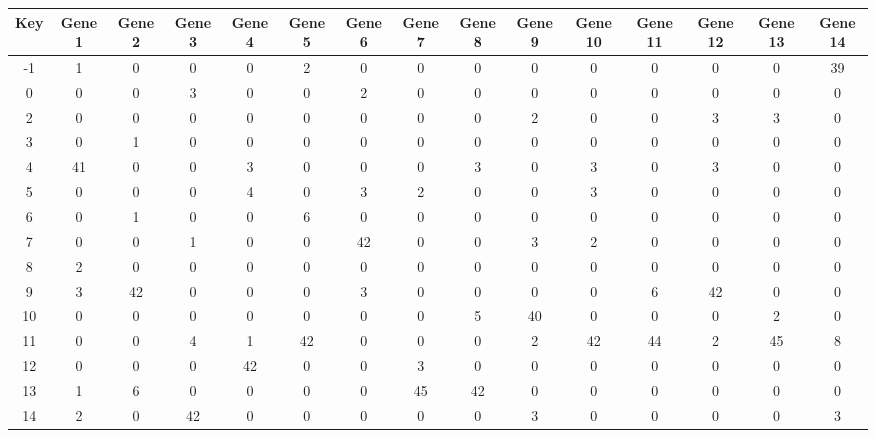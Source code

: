 \begin{tabular}{|c|c|c|c|c|c|c|c|c|c|c|c|c|c|c|}
\hline
Key & Gene 1 & Gene 2 & Gene 3 & Gene 4 & Gene 5 & Gene 6 & Gene 7 & Gene 8 & Gene 9 & Gene 10 & Gene 11 & Gene 12 & Gene 13 & Gene 14 \\
\hline
-1 & 1 & 0 & 0 & 0 & 2 & 0 & 0 & 0 & 0 & 0 & 0 & 0 & 0 & 39 \\
0 & 0 & 0 & 3 & 0 & 0 & 2 & 0 & 0 & 0 & 0 & 0 & 0 & 0 & 0 \\
2 & 0 & 0 & 0 & 0 & 0 & 0 & 0 & 0 & 2 & 0 & 0 & 3 & 3 & 0 \\
3 & 0 & 1 & 0 & 0 & 0 & 0 & 0 & 0 & 0 & 0 & 0 & 0 & 0 & 0 \\
4 & 41 & 0 & 0 & 3 & 0 & 0 & 0 & 3 & 0 & 3 & 0 & 3 & 0 & 0 \\
5 & 0 & 0 & 0 & 4 & 0 & 3 & 2 & 0 & 0 & 3 & 0 & 0 & 0 & 0 \\
6 & 0 & 1 & 0 & 0 & 6 & 0 & 0 & 0 & 0 & 0 & 0 & 0 & 0 & 0 \\
7 & 0 & 0 & 1 & 0 & 0 & 42 & 0 & 0 & 3 & 2 & 0 & 0 & 0 & 0 \\
8 & 2 & 0 & 0 & 0 & 0 & 0 & 0 & 0 & 0 & 0 & 0 & 0 & 0 & 0 \\
9 & 3 & 42 & 0 & 0 & 0 & 3 & 0 & 0 & 0 & 0 & 6 & 42 & 0 & 0 \\
10 & 0 & 0 & 0 & 0 & 0 & 0 & 0 & 5 & 40 & 0 & 0 & 0 & 2 & 0 \\
11 & 0 & 0 & 4 & 1 & 42 & 0 & 0 & 0 & 2 & 42 & 44 & 2 & 45 & 8 \\
12 & 0 & 0 & 0 & 42 & 0 & 0 & 3 & 0 & 0 & 0 & 0 & 0 & 0 & 0 \\
13 & 1 & 6 & 0 & 0 & 0 & 0 & 45 & 42 & 0 & 0 & 0 & 0 & 0 & 0 \\
14 & 2 & 0 & 42 & 0 & 0 & 0 & 0 & 0 & 3 & 0 & 0 & 0 & 0 & 3 \\
\hline
\end{tabular}
